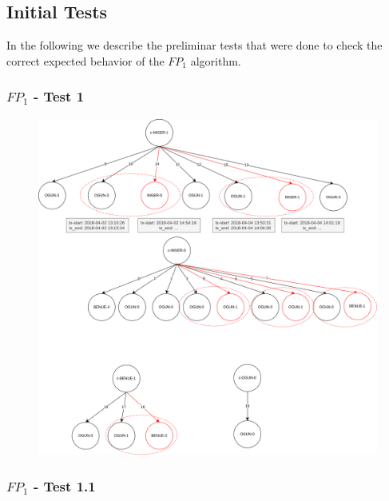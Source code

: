\begin{graysection}

\subsection{Initial Tests}

In the following we describe the preliminar tests that were done to check the correct
expected behavior of the ${FP}_1$ algorithm.

\subsubsection{${FP}_1$ - Test 1}

\begin{figure}[H]
  \hspace*{-2cm} 
  \includegraphics[scale=0.55]{images/2-QueryModel/FP1-test-1.png}
\end{figure}

\subsubsection{${FP}_1$ - Test 1.1}


\end{graysection}
